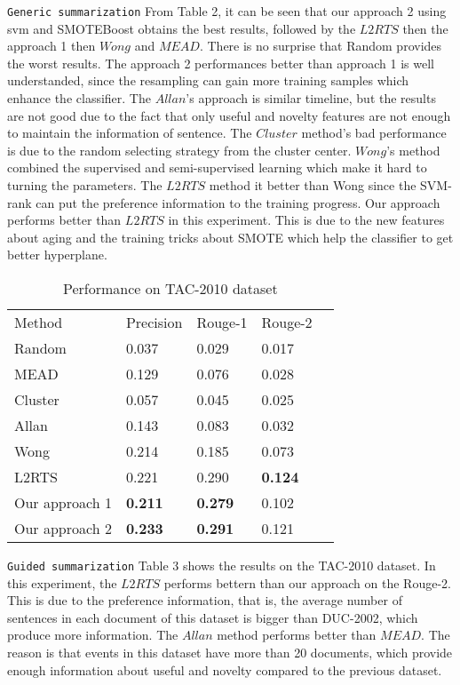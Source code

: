\documentclass{acm_proc_article-sp}
\begin{document}
\texttt{Generic summarization} From Table 2, it can be seen that our approach 2 using svm and SMOTEBoost obtains the best results, followed by the $L2RTS$ then the approach 1 then $Wong$ and $MEAD$. 
There is no surprise that Random provides the worst results. 
The approach 2 performances better than approach 1 is well understanded, since the resampling can gain more training samples which enhance the classifier.
The $Allan$'s approach is similar timeline, but the results are not good due to the fact that only useful and novelty features are not enough to maintain the information of sentence. 
The $Cluster$ method's bad performance is due to the random selecting strategy from the cluster center.
$Wong$'s method combined the supervised and semi-supervised learning which make it hard to turning the parameters.
The $L2RTS$ method it better than Wong since the SVM-rank can put the preference information to the training progress.
Our approach performs better than $L2RTS$ in this experiment. This is due to the new features about aging and the training tricks about SMOTE which help the classifier to get better hyperplane.


\begin{table}
\caption{Performance on TAC-2010 dataset }
\centering
\begin{tabular}{lllll}
\hline\noalign{\smallskip}
Method   &  Precision   & Rouge-1  &Rouge-2  \\
\noalign{\smallskip}
\hline
\noalign{\smallskip}
Random &  0.037           &      0.029                &  0.017									\\
MEAD    &	0.129			& 		0.076	 			&	0.028					 				\\
Cluster	&	0.057			&		0.045				&	0.025				 				     \\
Allan		&	0.143			&		0.083				&	0.032						 			\\
Wong		&	0.214			&		0.185				&	0.073									\\
L2RTS	&	0.221			&		0.290				&	\textbf{0.124}					 	\\
Our approach 1	&	\textbf{0.211}	&	\textbf{0.279}				&	0.102		          \\
Our approach 2	&	\textbf{0.233}	&	\textbf{0.291}				&	0.121		          \\
\hline
\end{tabular}
\end{table}

\texttt{Guided summarization} Table 3 shows the results on the TAC-2010 dataset.
In this experiment, the $L2RTS$ performs bettern than our approach on the Rouge-2.
This is due to the preference information, that is, the average number of sentences in each document of this dataset is bigger than DUC-2002, which produce more information.
The $Allan$ method performs better than $MEAD$.
The reason is that events in this dataset have more than 20 documents, which provide enough information about useful and novelty compared to the previous dataset.
\end{document}
